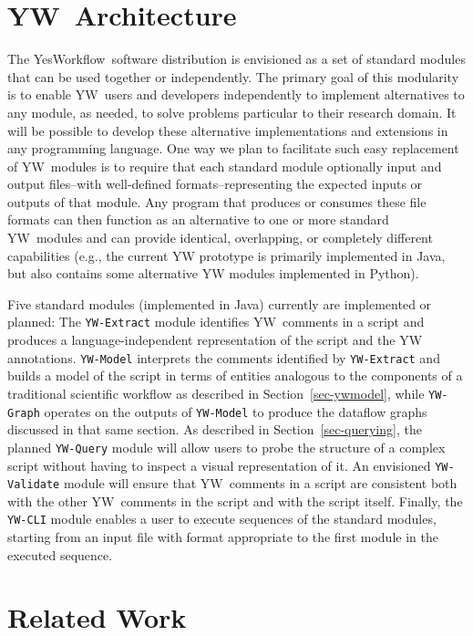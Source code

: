 \documentclass{article}
\newcommand{\YW}{\textsf{YesWorkflow}}
\newcommand{\yw}{\textsf{YW}}
\newcommand{\ywt}{\textsf{YW}}
\newcommand{\ywm}[1]{\texttt{#1}}
\begin{document}
\section{\ywt\ Architecture}

The \YW\ software distribution is envisioned as a set of standard
modules that can be used together or independently. The primary goal
of this modularity is to enable \yw\ users and developers
independently to implement alternatives to any module, as needed, to
solve problems particular to their research domain. It will be
possible to develop these alternative implementations and extensions
in any programming language.  One way we plan to facilitate such easy
replacement of \yw\ modules is to require that each standard module
optionally input and output files--with well-defined
formats--representing the expected inputs or outputs of that
module. Any program that produces or consumes these file formats can
then function as an alternative to one or more standard \yw\ modules
and can provide identical, overlapping, or completely different
capabilities (e.g., the current \textsf{YW} prototype is primarily
implemented in Java, but also contains some alternative \textsf{YW}
modules implemented in Python).

Five standard modules (implemented in Java) currently are implemented
or planned: The \ywm{YW-Extract} module identifies \yw\ comments in a
script and produces a language-independent representation of the
script and the YW annotations. \ywm{YW-Model} interprets the comments
identified by \ywm{YW-Extract} and builds a model of the script in
terms of entities analogous to the components of a traditional
scientific workflow as described in Section~\ref{sec-ywmodel}, while
\ywm{YW-Graph} operates on the outputs of \ywm{YW-Model} to produce
the dataflow graphs discussed in that same section. As described in
Section~\ref{sec-querying}, the planned \ywm{YW-Query} module will
allow users to probe the structure of a complex script without having
to inspect a visual representation of it. An envisioned
\ywm{YW-Validate} module will ensure that \yw\ comments in a script
are consistent both with the other \yw\ comments in the script and
with the script itself. Finally, the \ywm{YW-CLI} module enables a
user to execute sequences of the standard modules, starting from an
input file with format appropriate to the first module in the executed
sequence.


\section{Related Work}
\end{document}
